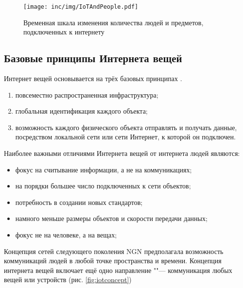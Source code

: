 \begin{figure}
  \centering
  \texttt{[image: inc/img/IoTAndPeople.pdf]}
	\caption{Временная шкала изменения количества людей и предметов, 
подключенных к интернету}
  \label{fig:iotandpeople}
\end{figure}


\subsection{Базовые принципы Интернета вещей}

Интернет вещей основывается на трёх базовых принципах \cite{roslyakov2014}.
\begin{enumerate}
	\item повсеместно распространенная инфраструктура;
	\item глобальная идентификация каждого объекта;
	\item возможность каждого физического объекта отправлять и получать данные, посредством локальной сети или сети Интернет, к которой он подключен.
\end{enumerate}

Наиболее важными отличиями Интернета вещей от интернета людей являются:
\begin{itemize}
	\item фокус на считывание информации, а не на коммуникациях;
	\item на порядки большее число подключенных к сети объектов;
	\item потребность в создании новых стандартов;
	\item намного меньше размеры объектов и скорости передачи данных;
	\item фокус не на человеке, а на вещах;
\end{itemize}

Концепция сетей следующего поколения NGN предполагала возможность коммуникаций людей в любой точке пространства и времени.
Концепция интернета вещей включает ещё одно направление ""--- коммуникация любых вещей или устройств (рис. \ref{fig:iotconcept})

